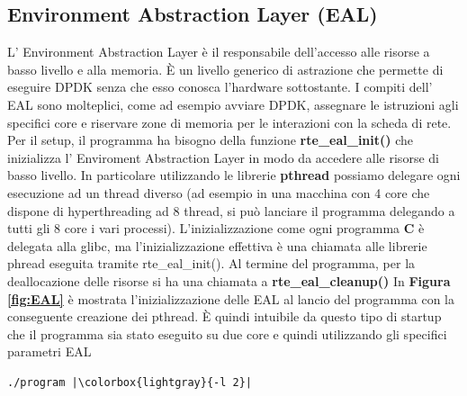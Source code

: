 \subsection*{Environment Abstraction Layer (EAL)}
L' Environment Abstraction Layer è il responsabile dell'accesso alle risorse a basso livello e alla memoria. È un livello generico di astrazione che permette di eseguire DPDK senza che esso conosca l'hardware sottostante. I compiti dell' EAL sono molteplici, come ad esempio avviare DPDK, assegnare le istruzioni agli specifici core e riservare zone di memoria per le interazioni con la scheda di rete.\\
Per il setup, il programma ha bisogno della funzione \textbf{rte\_eal\_init()} che inizializza l' Enviroment Abstraction Layer in modo da accedere alle risorse di basso livello. In particolare utilizzando le librerie \textbf{pthread} possiamo delegare ogni esecuzione ad un thread diverso (ad esempio in una macchina con 4 core che dispone di hyperthreading ad 8 thread, si può lanciare il programma delegando a tutti gli 8 core i vari processi).
L'inizializzazione come ogni programma \textbf{C} è delegata alla glibc, ma l'inizializzazione effettiva è una chiamata alle librerie phread eseguita tramite rte\_eal\_init().
Al termine del programma, per la deallocazione delle risorse si ha una chiamata a \textbf{rte\_eal\_cleanup()}
In \textbf{{Figura \ref{fig:EAL}}} è mostrata l'inizializzazione delle EAL al lancio del programma con la conseguente creazione dei pthread. È quindi intuibile da questo tipo di startup che il programma sia stato eseguito su due core e quindi utilizzando gli specifici parametri EAL \begin{verbatim}
./program |\colorbox{lightgray}{-l 2}|
\end{verbatim}
\FloatBarrier
